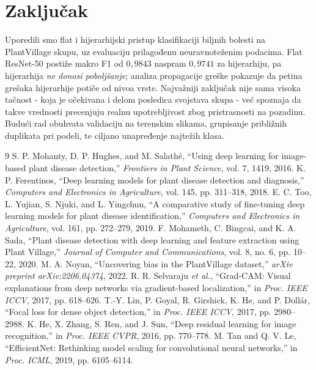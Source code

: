 \documentclass[conference]{IEEEtran}
\begin{document}
\section{Zaključak}
Uporedili smo flat i hijerarhijski pristup klasifikaciji biljnih bolesti na
PlantVillage skupu, uz evaluaciju prilagođenu neuravnoteženim podacima. Flat
ResNet-50 postiže makro F1 od $0{,}9843$ naspram $0{,}9741$ za hijerarhiju, pa
hijerarhija \emph{ne donosi poboljšanje}; analiza propagacije greške pokazuje da
petina grešaka hijerarhije potiče od nivoa vrste. Najvažniji zaključak nije sama
visoka tačnost - koja je očekivana i delom posledica svojstava skupa - već
spoznaja da takve vrednosti precenjuju realnu upotrebljivost zbog pristrasnosti na
pozadinu. Budući rad obuhvata validaciju na terenskim slikama, grupisanje
približnih duplikata pri podeli, te ciljano unapređenje najtežih klasa.

\begin{thebibliography}{9}
 S. P. Mohanty, D. P. Hughes, and M. Salathé, ``Using deep
learning for image-based plant disease detection,'' \emph{Frontiers in Plant
Science}, vol. 7, 1419, 2016.
 K. P. Ferentinos, ``Deep learning models for plant
disease detection and diagnosis,'' \emph{Computers and Electronics in
Agriculture}, vol. 145, pp. 311--318, 2018.
 E. C. Too, L. Yujian, S. Njuki, and L. Yingchun, ``A
comparative study of fine-tuning deep learning models for plant disease
identification,'' \emph{Computers and Electronics in Agriculture}, vol. 161, pp.
272--279, 2019.
 F. Mohameth, C. Bingcai, and K. A. Sada, ``Plant disease
detection with deep learning and feature extraction using Plant Village,''
\emph{Journal of Computer and Communications}, vol. 8, no. 6, pp. 10--22, 2020.
 M. A. Noyan, ``Uncovering bias in the PlantVillage dataset,''
\emph{arXiv preprint arXiv:2206.04374}, 2022.
 R. R. Selvaraju \emph{et al.}, ``Grad-CAM: Visual
explanations from deep networks via gradient-based localization,'' in
\emph{Proc. IEEE ICCV}, 2017, pp. 618--626.
 T.-Y. Lin, P. Goyal, R. Girshick, K. He, and P. Dollár,
``Focal loss for dense object detection,'' in \emph{Proc. IEEE ICCV}, 2017, pp.
2980--2988.
 K. He, X. Zhang, S. Ren, and J. Sun, ``Deep residual
learning for image recognition,'' in \emph{Proc. IEEE CVPR}, 2016, pp. 770--778.
 M. Tan and Q. V. Le, ``EfficientNet: Rethinking model
scaling for convolutional neural networks,'' in \emph{Proc. ICML}, 2019, pp.
6105--6114.
\end{thebibliography}
\end{document}
